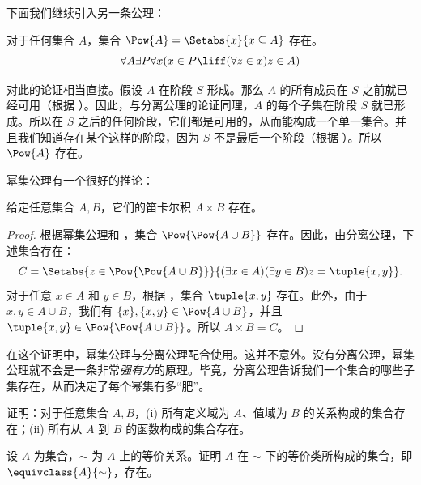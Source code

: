 \documentclass[../../../include/open-logic-section]{subfiles}
\begin{document}

下面我们继续引入另一条公理：

\begin{axiom}[幂集公理]
对于任何集合 $A$，集合 $\Pow{A} = \Setabs{x}{x \subseteq A}$ 存在。
\[
	\forall A \exists P \forall x(x \in P \liff (\forall z \in x)z \in A)
\]
\end{axiom}

对此的论证相当直接。假设 $A$ 在阶段 $S$ 形成。那么 $A$ 的所有成员在 $S$ 之前就已经可用（根据 \stagesacc）。因此，与分离公理的论证同理，$A$ 的每个子集在阶段 $S$ 就已形成。所以在 $S$ 之后的任何阶段，它们都是可用的，从而能构成一个单一集合。并且我们知道存在某个这样的阶段，因为 $S$ 不是最后一个阶段（根据 \stagessucc）。所以 $\Pow{A}$ 存在。

幂集公理有一个很好的推论：

\begin{prop}\label{thm:Products}
给定任意集合 $A, B$，它们的笛卡尔积 $A \times B$ 存在。
\end{prop}

\begin{proof}
根据幂集公理和 ，集合 $\Pow{\Pow{A \cup B}}$ 存在。因此，由分离公理，下述集合存在：
\[
	C = \Setabs{z \in \Pow{\Pow{A \cup B}}}{(\exists x \in A)(\exists y \in B) z = \tuple{x, y}}.
\]
对于任意 $x \in A$ 和 $y \in B$，根据 ，集合 $\tuple{x, y}$ 存在。此外，由于 $x, y \in A \cup B$，我们有 $\{x\}, \{x, y\} \in \Pow{A \cup B}$，并且 $\tuple{x,y} \in \Pow{\Pow{A \cup B}}$。所以 $A \times B = C$。
\end{proof}

在这个证明中，幂集公理与分离公理配合使用。这并不意外。没有分离公理，幂集公理就不会是一条非常\emph{强有力}的原理。毕竟，分离公理告诉我们一个集合的哪些子集存在，从而决定了每个幂集有多“肥”。

\begin{prob}
证明：对于任意集合 $A, B$，(i) 所有定义域为 $A$、值域为 $B$ 的关系构成的集合存在；(ii) 所有从 $A$ 到 $B$ 的函数构成的集合存在。
\end{prob}

\begin{prob}
设 $A$ 为集合，$\sim$ 为 $A$ 上的等价关系。证明 $A$ 在 $\sim$ 下的等价类所构成的集合，即 $\equivclass{A}{\sim}$，存在。
\end{prob}
\end{document}
